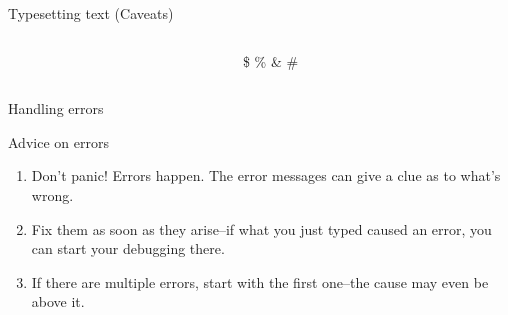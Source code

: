\documentclass[,aspectratio=43]{beamer}
\newcommand{\VERB}{\Verb[commandchars=\\\{\}]}
\newenvironment{Shaded}{\begin{snugshade}}{\end{snugshade}}
\newcommand{\FunctionTok}[1]{\textcolor[rgb]{0.02,0.16,0.49}{#1}}
\begin{document}
\begin{frame}[fragile]{Typesetting text (Caveats)}
\begin{columns}[T]
\begin{column}{0.48\textwidth}
\vspace{-1em}

\begin{Shaded}
\begin{Highlighting}[]
\FunctionTok{\textbackslash{}$} \FunctionTok{\textbackslash{}\%} \FunctionTok{\textbackslash{}\&} \FunctionTok{\textbackslash{}\#}
\end{Highlighting}
\end{Shaded}
\end{column}

\begin{column}{0.48\textwidth}
\$ \% \& \#
\end{column}
\end{columns}
\end{frame}

\begin{frame}[fragile]{Handling errors}
\protect\hypertarget{handling-errors}{}

\begin{block}{Advice on errors}

\begin{enumerate}
\item
  Don't panic! Errors happen. The error messages can give a clue as to
  what's wrong.
\item
  Fix them as soon as they arise--if what you just typed caused an
  error, you can start your debugging there.
\item
  If there are multiple errors, start with the first one--the cause may
  even be above it.
\end{enumerate}

\end{block}
\end{frame}
\end{document}
